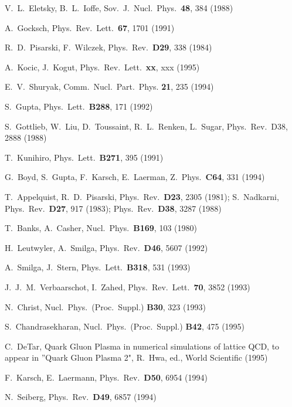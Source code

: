 \begin{thebibliography}{xx}
V.~L.~Eletsky, B.~L.~Ioffe, Sov.~J.~Nucl.~Phys.~{\bf 48}, 384 (1988)

A.~Gocksch, Phys.~Rev.~Lett.~{\bf 67}, 1701 (1991)

R.~D.~Pisarski, F.~Wilczek,
Phys.~Rev.~{\bf D29}, 338 (1984)

A.~Kocic, J.~Kogut,
Phys.~Rev.~Lett.~{\bf xx}, xxx (1995)

E.~V.~Shuryak, Comm.~Nucl.~Part.~Phys. {\bf 21}, 235 (1994)

S.~Gupta, Phys.~Lett.~{\bf B288}, 171 (1992)

S.~Gottlieb, W.~Liu, D.~Toussaint, R.~L.~Renken, L.~Sugar,
Phys.~Rev.~{D38}, 2888 (1988)

T.~Kunihiro, Phys.~Lett.~{\bf B271}, 395 (1991)

G.~Boyd, S.~Gupta, F.~Karsch, E.~Laerman,
Z.~Phys.~{\bf C64}, 331 (1994)

T.~Appelquist, R.~D.~Pisarski, Phys.~Rev.~{\bf D23}, 2305 (1981);
S.~Nadkarni, Phys.~Rev.~{\bf D27}, 917 (1983);
Phys.~Rev.~{\bf D38}, 3287 (1988)

T.~Banks, A.~Casher,
Nucl.~Phys.~{\bf B169}, 103 (1980)

H.~Leutwyler, A.~Smilga,
Phys.~Rev.~{\bf D46}, 5607 (1992)

A.~Smilga, J.~Stern,
Phys.~Lett.~{\bf B318}, 531 (1993)

J.~J.~M.~Verbaarschot, I.~Zahed,
Phys.~Rev.~Lett.~{\bf 70}, 3852 (1993)

N.~Christ,
Nucl.~Phys.~(Proc.~Suppl.) {\bf B30}, 323 (1993)

S.~Chandrasekharan,
Nucl.~Phys.~(Proc.~Suppl.) {\bf B42}, 475 (1995)

C.~DeTar,
Quark Gluon Plasma in numerical simulations of lattice QCD,
to appear in ''Quark Gluon Plasma 2", R.~Hwa, ed.,
World Scientific (1995)

F.~Karsch, E.~Laermann,
Phys.~Rev.~{\bf D50}, 6954 (1994)

N.~Seiberg,
Phys.~Rev.~{\bf D49}, 6857 (1994)

\end{thebibliography}
